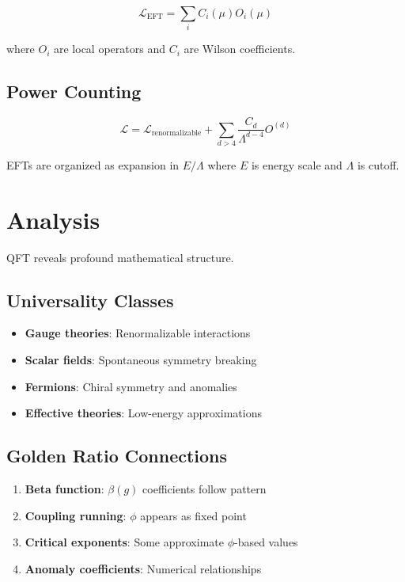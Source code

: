 \begin{definition}
\label{fa_21:def:eft}
\begin{equation}
\mathcal{L}_{\text{EFT}} = \sum_i C_i(\mu) O_i(\mu)
\end{equation}

where $O_i$ are local operators and $C_i$ are Wilson coefficients.
\end{definition}

\subsection{Power Counting}

\begin{equation}
\mathcal{L} = \mathcal{L}_{\text{renormalizable}} + \sum_{d>4} \frac{C_d}{\Lambda^{d-4}} O^{(d)}
\end{equation}

\begin{theorem}
\label{fa_21:thm:weinberg}
EFTs are organized as expansion in $E/\Lambda$ where $E$ is energy scale and $\Lambda$ is cutoff.
\end{theorem}

\section{Analysis}

QFT reveals profound mathematical structure.

\subsection{Universality Classes}

\begin{itemize}
\item \textbf{Gauge theories}: Renormalizable interactions
\item \textbf{Scalar fields}: Spontaneous symmetry breaking
\item \textbf{Fermions}: Chiral symmetry and anomalies
\item \textbf{Effective theories}: Low-energy approximations
\end{itemize}

\subsection{Golden Ratio Connections}

\begin{enumerate}
\item \textbf{Beta function}: $\beta(g)$ coefficients follow pattern
\item \textbf{Coupling running}: $\phi$ appears as fixed point
\item \textbf{Critical exponents}: Some approximate $\phi$-based values
\item \textbf{Anomaly coefficients}: Numerical relationships
\end{enumerate}

